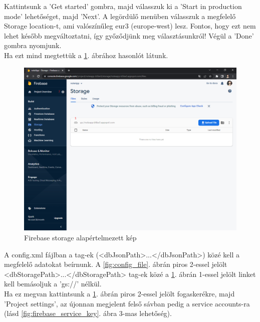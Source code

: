 \noindent Kattintsunk a 'Get started' gombra, majd válasszuk ki a 'Start in production mode' lehetőséget, majd 'Next'. A legördülő menüben válasszuk a megfelelő Storage location-t, ami valószínűleg eur3 (europe-west) lesz. Fontos, hogy ezt nem lehet később megváltoztatni, így győződjünk meg választásunkról! Végül a 'Done' gombra nyomjunk.
\vspace{5pt}\\Ha ezt mind megtettük a \ref{fig:firebase_storage_default}. ábrához hasonlót látunk.

\begin{figure}[H]
	\centering
	\includegraphics[scale=0.2]{images/config_4.png}
	\caption{Firebase storage alapértelmezett kép}
	\label{fig:firebase_storage_default}
\end{figure}

\noindent A config.xml fájlban a tag-ek (<dbJsonPath>...</dbJsonPath>) közé kell a megfelelő adatokat beírnunk. A \ref{fig:config_file}. ábrán piros 2-essel jelölt <dbStoragePath>...</dbStoragePath> tag-ek közé a \ref{fig:firebase_storage_default}. ábrán 1-essel jelölt linket kell bemásoljuk a 'gs://' nélkül.
\vspace{5pt}\\Ha ez megvan kattintsunk a \ref{fig:firebase_storage_default}. ábrán piros 2-essel jelölt fogaskerékre, majd 'Project settings', az újonnan megjelent felső sávban pedig a service accounts-ra (lásd \ref{fig:firebase_service_key}. ábra 3-mas lehetőség).

